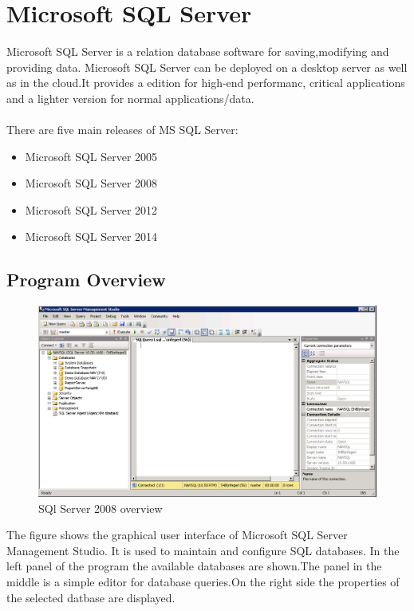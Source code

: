   \section{Microsoft SQL Server}
  Microsoft SQL Server is a relation database software for saving,modifying and providing data. Microsoft SQL Server can be deployed on a desktop server as well as in the cloud.It provides a edition for high-end performanc, critical applications and a lighter version for normal applications/data.\cite{sqlserver}
  \\\\
  There are five main releases of MS SQL Server:
  \begin{itemize}
          \item Microsoft SQL Server 2005
          \item Microsoft SQL Server 2008 
          \item Microsoft SQL Server 2012 
          \item Microsoft SQL Server 2014
  \end{itemize}
        \cite{sqlserver}
  \subsection{Program Overview}
  \begin{figure}[H]
  \centering
  \includegraphics[width=\textwidth,height=\textheight,keepaspectratio]{graphics/sqlserver.PNG}
  \caption{SQl Server 2008 overview}
  \end{figure} 

  The figure shows the graphical user interface of  Microsoft SQL Server Management Studio. It is used to maintain and configure SQL databases. In the left panel of the program the available databases are shown.The panel in the middle is a simple editor for database queries.On the right side the properties of the selected datbase are displayed.    
  \newpage
